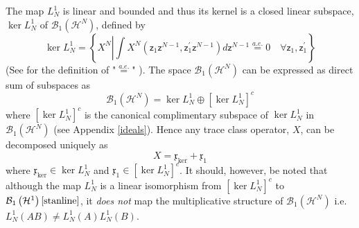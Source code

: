 \documentclass[aps,preprint]{revtex4}%
\begin{document}
The map $L_{N}^{1}$ is linear and bounded and thus its kernel is a closed
linear subspace, $\ker L_{N}^{1}$ of $\mathcal{B}_{1}\left(  \mathcal{H}%
^{N}\right)  $, defined by
\begin{equation}
\ker L_{N}^{1}=\left\{  X^{N}\left\vert \int X^{N}\left(  \mathsf{z}%
_{1}\mathsf{z}^{N-1},\mathsf{z}_{1}^{\prime}\mathsf{z}^{N-1}\right)
d\mathsf{z}^{N-1}\overset{a.e.}{=}0\quad\forall\mathsf{z}_{1},\mathsf{z}%
_{1}^{\prime}\right.  \right\}
\end{equation}
(See \cite{ae} for the definition of "$\overset{a.e.}{=}$" ). The space
$\mathcal{B}_{1}\left(  \mathcal{H}^{N}\right)  $ can be expressed as direct
sum of subspaces as
\begin{equation}
\mathcal{B}_{1}\left(  \mathcal{H}^{N}\right)  =\ker L_{N}^{1}\oplus\left[
\ker L_{N}^{1}\right]  ^{c} \label{dc}%
\end{equation}
where $\left[  \ker L_{N}^{1}\right]  ^{c}$ is the canonical complimentary
subspace of $\ker L_{N}^{1}$ in $\mathcal{B}_{1}\left(  \mathcal{H}%
^{N}\right)  $ (see Appendix \ref{ideals}). Hence any trace class operator,
$X$, can be decomposed uniquely as
\begin{equation}
X=\mathfrak{x}_{\ker}+\mathfrak{x}_{1} \label{orthog}%
\end{equation}
where $\mathfrak{x}_{\ker}\in\ker L_{N}^{1}$ and $\mathfrak{x}_{1}\in\left[
\ker L_{N}^{1}\right]  ^{c}$. It should, however, be noted that although the
map $L_{N}^{1}$ is a linear isomorphism from $\left[  \ker L_{N}^{1}\right]
^{c}$ to $\mathcal{B}_{1}\left(  \mathcal{H}^{1}\right)  \cite{stanline}$, it
\emph{does not }map the multiplicative structure of $\mathcal{B}_{1}\left(
\mathcal{H}^{N}\right)  $ i.e. $L_{N}^{1}\left(  AB\right)  \neq L_{N}%
^{1}\left(  A\right)  L_{N}^{1}\left(  B\right)  $.
\end{document}
